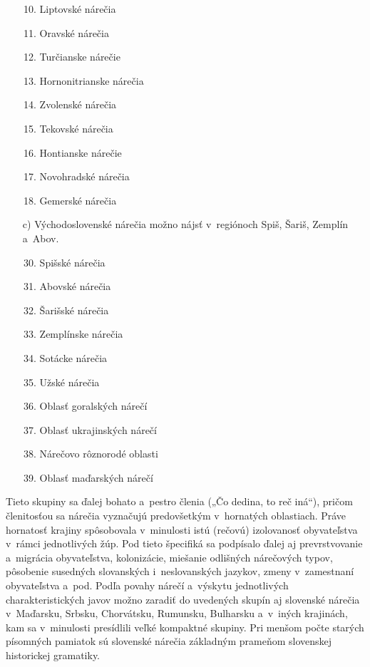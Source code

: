 \begin{multicols}{2}
\begin{itemize}
\begin{enumerate}
\setcounter{enumi}{9}
\item Liptovské nárečia
\item Oravské nárečia
\item Turčianske nárečie
\item Hornonitrianske nárečia
\item Zvolenské nárečia
\item Tekovské nárečia
\item Hontianske nárečie
\item Novohradské nárečia
\item Gemerské nárečia
\end{enumerate}

\item[c)] Východoslovenské nárečia možno nájsť v~regiónoch Spiš, Šariš, Zemplín a~Abov.

\begin{enumerate}
\setcounter{enumi}{29}
\item Spišské nárečia
\item Abovské nárečia
\item Šarišské nárečia
\item Zemplínske nárečia
\item Sotácke nárečia
\item Užské nárečia
\setcounter{enumi}{39}
\item Oblasť goralských nárečí
\item Oblasť ukrajinských nárečí
\item Nárečovo rôznorodé oblasti 
\item Oblasť maďarských nárečí
\end{enumerate}
\end{itemize}

\medskip

Tieto skupiny sa ďalej bohato a~pestro členia („Čo dedina, to reč iná“), pričom členitosťou sa nárečia vyznačujú predovšetkým v~hornatých oblastiach. Práve hornatosť krajiny spôsobovala v~minulosti istú (rečovú) izolovanosť obyvateľstva v~rámci jednotlivých žúp. Pod tieto špecifiká sa podpísalo ďalej aj prevrstvovanie a~migrácia obyvateľstva, kolonizácie, miešanie odlišných nárečových typov, pôsobenie susedných slovanských i~neslovanských jazykov, zmeny v~zamestnaní obyvateľstva a~pod. Podľa povahy nárečí a~výskytu jednotlivých charakteristických javov možno zaradiť do uvedených skupín aj slovenské nárečia v~Maďarsku, Srbsku, Chorvátsku, Rumunsku, Bulharsku a~v~iných krajinách, kam sa v~minulosti presídlili veľké kompaktné skupiny. Pri menšom počte starých písomných pamiatok sú slovenské nárečia základným prameňom slovenskej historickej gramatiky.


\end{multicols}
